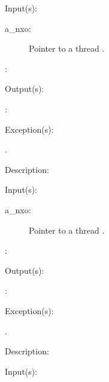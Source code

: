 \begin{capi}
\begin{capilist}
	\item[Input(s): ]
		\begin{description}\item[]
		\item[a\_nxo: ]
			Pointer to a thread .
		\item[: ]
		\end{description}
	\item[Output(s): ]
		\begin{description}\item[]
		\item[: ]
		\end{description}
	\item[Exception(s): ]
		\begin{description}\item[]
		\item[.]
		\end{description}
	\item[Description: ]
	\end{capilist}
\label{nxo_thread_}
	\begin{capilist}
	\item[Input(s): ]
		\begin{description}\item[]
		\item[a\_nxo: ]
			Pointer to a thread .
		\item[: ]
		\end{description}
	\item[Output(s): ]
		\begin{description}\item[]
		\item[: ]
		\end{description}
	\item[Exception(s): ]
		\begin{description}\item[]
		\item[.]
		\end{description}
	\item[Description: ]
	\end{capilist}
\label{nxo_thread_}
	\begin{capilist}
	\item[Input(s): ]
		\begin{description}\item[]

\end{description}
\end{capilist}
\end{capi}

